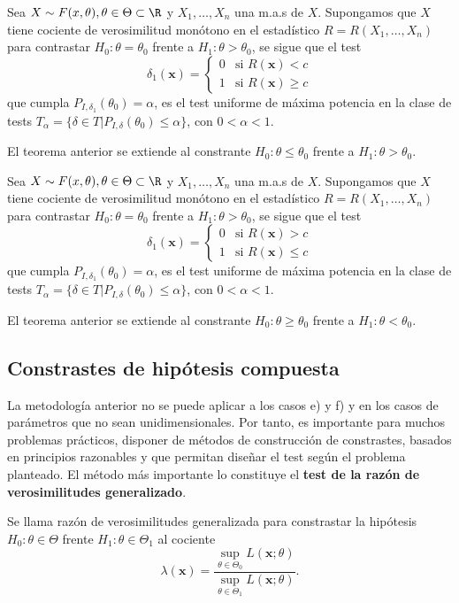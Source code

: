\begin{tcolorbox}[colback=blue!5!white, colframe=blue!75!black, title=\textbf{Cociente de verosimilitudes monótono}]
Sea $X\sim F(x,\theta),\theta\in \Theta\subset \R$ y $X_1,\dots,X_n$ una m.a.s de $X$. Supongamos que  $X$ tiene cociente de verosimilitud monótono en el estadístico $R=R(X_1,\dots,X_n)$ para contrastar $H_0:\theta=\theta_0$ frente a $H_1:\theta>\theta_0$, se sigue que el test \[
\delta_1(\mathbf{x})=\begin{cases}
    0 & \text{si }R(\mathbf{x})<c\\
    1 & \text{si }R(\mathbf{x})\ge c
\end{cases}
\] que cumpla $P_{I,\delta_1}(\theta_0)=\alpha$, es el test uniforme de máxima potencia en la clase de tests $T_\alpha=\{\delta\in T|P_{I,\delta}(\theta_0)\le \alpha\} $, con $0<\alpha<1$.
\end{tcolorbox}
El teorema anterior se extiende al constrante $H_0:\theta\le \theta_0$ frente a $H_1:\theta>\theta_0$.
\begin{tcolorbox}[colback=blue!5!white, colframe=blue!75!black, title=\textbf{Cociente de verosimilitudes monótono}]
Sea $X\sim F(x,\theta),\theta\in \Theta\subset \R$ y $X_1,\dots,X_n$ una m.a.s de $X$. Supongamos que  $X$ tiene cociente de verosimilitud monótono en el estadístico $R=R(X_1,\dots,X_n)$ para contrastar $H_0:\theta=\theta_0$ frente a $H_1:\theta>\theta_0$, se sigue que el test \[
\delta_1(\mathbf{x})=\begin{cases}
    0 & \text{si }R(\mathbf{x})>c\\
    1 & \text{si }R(\mathbf{x})\le c
\end{cases}
\] que cumpla $P_{I,\delta_1}(\theta_0)=\alpha$, es el test uniforme de máxima potencia en la clase de tests $T_\alpha=\{\delta\in T|P_{I,\delta}(\theta_0)\le \alpha\} $, con $0<\alpha<1$.
\end{tcolorbox}
El teorema anterior se extiende al constrante $H_0:\theta\ge \theta_0$ frente a $H_1:\theta<\theta_0$.
\subsection{Constrastes de hipótesis compuesta}
La metodología anterior no se puede aplicar a los casos e) y f) y en los casos de parámetros que no sean unidimensionales. Por tanto, es importante para muchos problemas prácticos, disponer de métodos de construcción de constrastes, basados en principios razonables y que permitan diseñar el test según el problema planteado. El método más importante lo constituye el \textbf{test de la razón de verosimilitudes generalizado}. 
\begin{tcolorbox}[colback=blue!5!white, colframe=blue!75!black, title=\textbf{Razón de verosimilitudes Generalizada (RVG)}]
Se llama razón de verosimilitudes generalizada para constrastar la hipótesis $H_0:\theta\in \Theta$ frente $H_1:\theta\in\Theta_1$ al cociente \[
\lambda(\mathbf{x})=\dfrac{\displaystyle \sup_{\theta\in \Theta_0}L(\mathbf{x};\theta)}{\displaystyle \sup_{\theta\in\Theta_1}L(\mathbf{x};\theta)}.
\] 
\end{tcolorbox}

